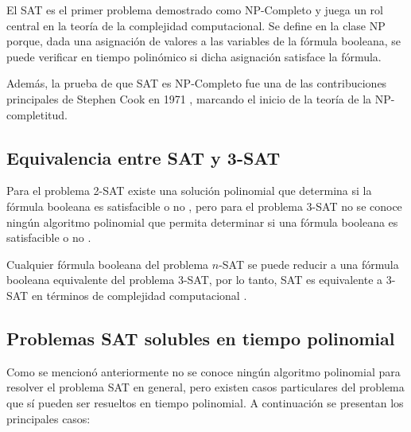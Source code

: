 El SAT es el primer problema demostrado como NP-Completo \cite{authomataTheory} y juega un rol central en la teoría de la complejidad computacional. Se define en la clase NP porque, dada una asignación de valores a las variables de la fórmula booleana, se puede verificar en tiempo polinómico si dicha asignación satisface la fórmula.

Además, la prueba de que SAT es NP-Completo fue una de las contribuciones principales de Stephen Cook en 1971 \cite{authomataTheory}, marcando el inicio de la teoría de la NP-completitud.

\subsection{Equivalencia entre SAT y 3-SAT}

Para el problema 2-SAT existe una solución polinomial que determina si la fórmula booleana es satisfacible o no \cite{geeksforgeeks_2sat}, pero para el problema 3-SAT no se conoce ningún algoritmo polinomial que permita
determinar si una fórmula booleana es satisfacible o no \cite{authomataTheory}.

Cualquier fórmula booleana del problema $n$-SAT se puede reducir a una fórmula booleana equivalente del problema 3-SAT, 
por lo tanto, SAT es equivalente a 3-SAT en términos de complejidad computacional \cite{authomataTheory}.

\subsection{Problemas SAT solubles en tiempo polinomial}

Como se mencionó anteriormente no se conoce ningún algoritmo polinomial para resolver el problema SAT en general, pero
existen casos particulares del problema que sí pueden ser resueltos en tiempo polinomial. A continuación se presentan los
principales casos:

